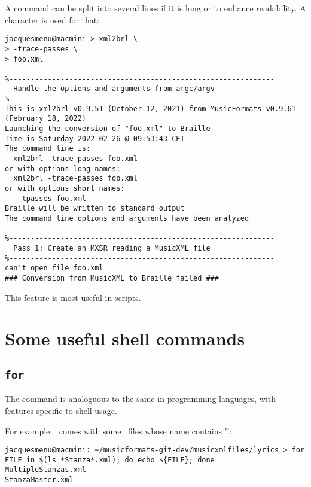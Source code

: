 A command can be split into several lines if it is long or to enhance readability. A \code{\textbackslash} character is used for that:
\begin{lstlisting}[language=Terminal]
jacquesmenu@macmini > xml2brl \
> -trace-passes \
> foo.xml

%--------------------------------------------------------------
  Handle the options and arguments from argc/argv
%--------------------------------------------------------------
This is xml2brl v0.9.51 (October 12, 2021) from MusicFormats v0.9.61 (February 18, 2022)
Launching the conversion of "foo.xml" to Braille
Time is Saturday 2022-02-26 @ 09:53:43 CET
The command line is:
  xml2brl -trace-passes foo.xml
or with options long names:
  xml2brl -trace-passes foo.xml
or with options short names:
   -tpasses foo.xml
Braille will be written to standard output
The command line options and arguments have been analyzed

%--------------------------------------------------------------
  Pass 1: Create an MXSR reading a MusicXML file
%--------------------------------------------------------------
can't open file foo.xml
### Conversion from MusicXML to Braille failed ###
\end{lstlisting}

This feature is most useful in scripts.


\section{Some useful shell commands}

\subsection{{\tt for}}

The \code{for} command is analoguous to the same in programming languages, with features specific to shell usage.

For example, \mf\ comes with some \mxml\ files whose name contains '\code{Stanza}':
\begin{lstlisting}[language=Terminal]
jacquesmenu@macmini: ~/musicformats-git-dev/musicxmlfiles/lyrics > for FILE in $(ls *Stanza*.xml); do echo ${FILE}; done
MultipleStanzas.xml
StanzaMaster.xml
\end{lstlisting}

